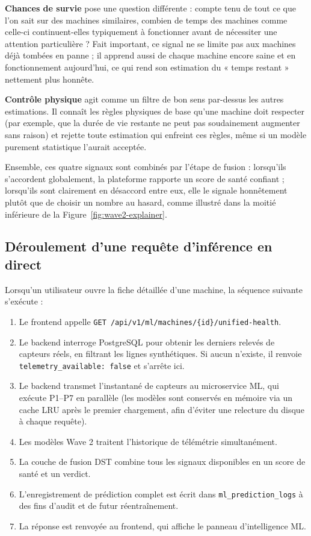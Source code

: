 \textbf{Chances de survie} pose une question différente : compte tenu de tout ce que l'on sait sur des machines similaires, combien de temps des machines comme celle-ci continuent-elles typiquement à fonctionner avant de nécessiter une attention particulière ? Fait important, ce signal ne se limite pas aux machines déjà tombées en panne ; il apprend aussi de chaque machine encore saine et en fonctionnement aujourd'hui, ce qui rend son estimation du « temps restant » nettement plus honnête.

\textbf{Contrôle physique} agit comme un filtre de bon sens par-dessus les autres estimations. Il connaît les règles physiques de base qu'une machine doit respecter (par exemple, que la durée de vie restante ne peut pas soudainement augmenter sans raison) et rejette toute estimation qui enfreint ces règles, même si un modèle purement statistique l'aurait acceptée.

Ensemble, ces quatre signaux sont combinés par l'étape de fusion : lorsqu'ils s'accordent globalement, la plateforme rapporte un score de santé confiant ; lorsqu'ils sont clairement en désaccord entre eux, elle le signale honnêtement plutôt que de choisir un nombre au hasard, comme illustré dans la moitié inférieure de la Figure~\ref{fig:wave2-explainer}.

\subsection{Déroulement d'une requête d'inférence en direct}

Lorsqu'un utilisateur ouvre la fiche détaillée d'une machine, la séquence suivante s'exécute :

\begin{enumerate}
\item Le frontend appelle \texttt{GET /api/v1/ml/machines/\{id\}/unified-health}.
\item Le backend interroge PostgreSQL pour obtenir les derniers relevés de capteurs réels, en filtrant les lignes synthétiques. Si aucun n'existe, il renvoie \texttt{telemetry\_available: false} et s'arrête ici.
\item Le backend transmet l'instantané de capteurs au microservice ML, qui exécute P1--P7 en parallèle (les modèles sont conservés en mémoire via un cache LRU après le premier chargement, afin d'éviter une relecture du disque à chaque requête).
\item Les modèles Wave 2 traitent l'historique de télémétrie simultanément.
\item La couche de fusion DST combine tous les signaux disponibles en un score de santé et un verdict.
\item L'enregistrement de prédiction complet est écrit dans \texttt{ml\_prediction\_logs} à des fins d'audit et de futur réentraînement.
\item La réponse est renvoyée au frontend, qui affiche le panneau d'intelligence ML.
\end{enumerate}

